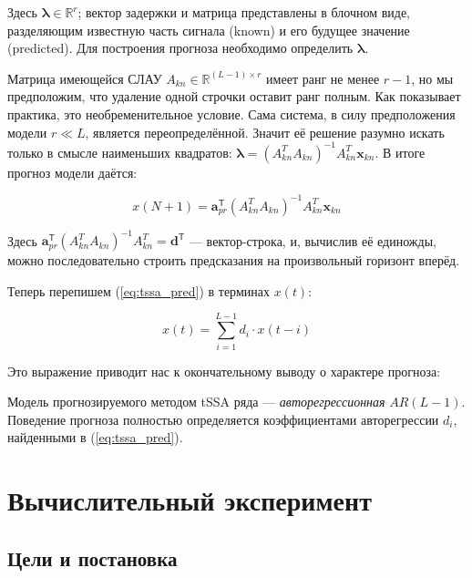 	    	Здесь $ \boldsymbol{\lambda} \in \mathbb{R}^r $; вектор задержки и матрица представлены в блочном виде, разделяющим известную часть сигнала (known) и его будущее значение (predicted). Для построения прогноза необходимо определить $ \boldsymbol{\lambda} $. 
	    	
	    	Матрица имеющейся СЛАУ $ A_{kn} \in \mathbb{R}^{(L - 1) \times r} $ имеет ранг не менее $ r - 1 $, но мы предположим, что удаление одной строчки оставит ранг полным. Как показывает практика, это необременительное условие. Сама система, в силу предположения модели $ r \ll L $, является переопределённой. Значит её решение разумно искать только в смысле наименьших квадратов: $ \boldsymbol{\lambda} = (A_{kn}^T A_{kn})^{-1} A_{kn}^T \mathbf{x}_{kn} $. В итоге прогноз модели даётся:
	    	
	    	\begin{equation}\label{eq:tssa_pred}
	    		x(N + 1) = \mathbf{a}_{pr}^{\mathsf{T}} (A_{kn}^T A_{kn})^{-1} A_{kn}^T \mathbf{x}_{kn}
	    	\end{equation}
	    
	    	 Здесь $ \mathbf{a}_{pr}^{\mathsf{T}} (A_{kn}^T A_{kn})^{-1} A_{kn}^T = \mathbf{d}^{\mathsf{T}} $ --- вектор-строка, и, вычислив её единожды, можно последовательно строить предсказания на произвольный горизонт вперёд.
	    	 
	    	 Теперь перепишем (\ref{eq:tssa_pred}) в терминах $ x(t) $:
	    	 
	    	 \begin{equation*}\label{eq:autoregr}
	    	 	x(t) = \sum\limits_{i = 1}^{L - 1} d_i \cdot x(t - i)
	    	 \end{equation*}
	    	 
	    	 Это выражение приводит нас к окончательному выводу о характере прогноза:
	    	 
	    	 \begin{Th}
	    	 	Модель прогнозируемого методом tSSA ряда --- \textit{авторегрессионная} $ AR(L - 1) $. Поведение прогноза полностью определяется коэффициентами авторегрессии $ d_i $, найденными в (\ref{eq:tssa_pred}).
	    	 \end{Th}
	    
	\section{Вычислительный эксперимент}	
	
		\subsection*{Цели и постановка}
	
